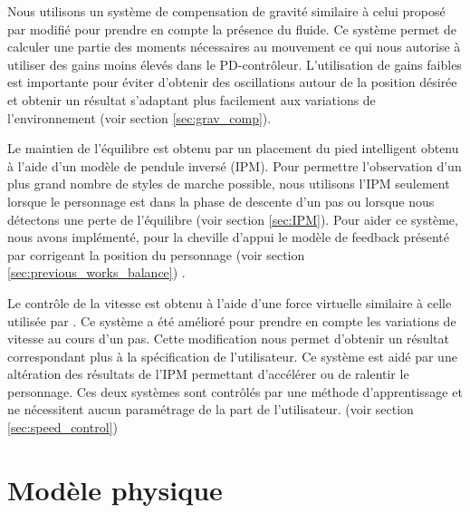 \documentclass[runningheads,a4paper]{llncs}
\begin{document}
Nous utilisons un système de compensation de gravité similaire à celui proposé par \cite{coros2010generalized} modifié pour prendre en compte la présence du fluide. Ce système permet de calculer une partie des moments nécessaires au mouvement ce qui nous autorise à utiliser des gains moins élevés dans le PD-contrôleur. L'utilisation de gains faibles est importante pour éviter d'obtenir des oscillations autour de la position désirée et obtenir un résultat s'adaptant plus facilement aux variations de l'environnement (voir section \ref{sec:grav_comp}).

Le maintien de l'équilibre est obtenu par un placement du pied intelligent obtenu à l'aide d'un modèle de pendule inversé (IPM). Pour permettre l'observation d'un plus grand nombre de styles de marche possible, nous utilisons l'IPM seulement lorsque le personnage est dans la phase de descente d'un pas ou lorsque nous détectons une perte de l'équilibre (voir section \ref{sec:IPM}). Pour aider ce système, nous avons implémenté, pour  la cheville d'appui le modèle de feedback présenté par \cite{yin2007simbicon} corrigeant la position du personnage (voir section \ref{sec:previous_works_balance}) .

Le contrôle de la vitesse est obtenu à l'aide d'une force virtuelle similaire à celle utilisée par \cite{coros2010generalized}. Ce système a été amélioré pour prendre en compte les variations de vitesse au cours d'un pas. Cette modification nous permet d'obtenir un résultat correspondant plus à la spécification de l'utilisateur. Ce système est aidé par une altération des résultats de l'IPM permettant d'accélérer ou de ralentir le personnage. Ces deux systèmes sont contrôlés par une méthode d'apprentissage et ne nécessitent aucun paramétrage de la part de l'utilisateur. (voir section \ref{sec:speed_control})

%
\section{Modèle physique}
\label{sec:model_physique}
\end{document}
